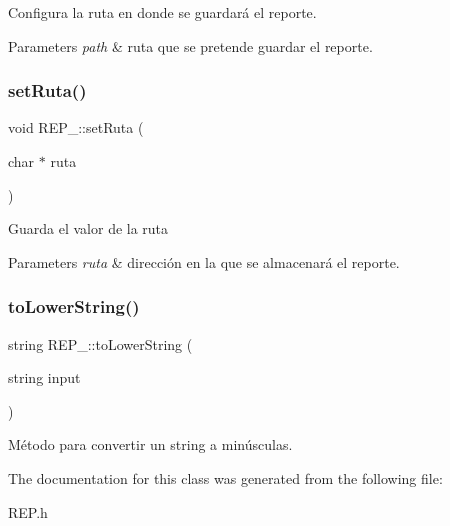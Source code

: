 Configura la ruta en donde se guardará el reporte. 
\begin{DoxyParams}{Parameters}
{\em path} & ruta que se pretende guardar el reporte. \\
\hline
\end{DoxyParams}
\mbox{\label{classREP___a6e13e906980b5ee0d3eb87021f3b73b9}} 
\subsubsection{\texorpdfstring{set\+Ruta()}{setRuta()}}
{\footnotesize\ttfamily void R\+E\+P\+\_\+\+::set\+Ruta (\begin{DoxyParamCaption}\item[{char $\ast$}]{ruta }\end{DoxyParamCaption})\hspace{0.3cm}{\ttfamily [inline]}}

Guarda el valor de la ruta 
\begin{DoxyParams}{Parameters}
{\em ruta} & dirección en la que se almacenará el reporte. \\
\hline
\end{DoxyParams}
\mbox{\label{classREP___ae1d0fa6e478eac36a3246d73e574b9f2}} 
\subsubsection{\texorpdfstring{to\+Lower\+String()}{toLowerString()}}
{\footnotesize\ttfamily string R\+E\+P\+\_\+\+::to\+Lower\+String (\begin{DoxyParamCaption}\item[{string}]{input }\end{DoxyParamCaption})}

Método para convertir un string a minúsculas. 

The documentation for this class was generated from the following file\+:\begin{DoxyCompactItemize}
\item 
R\+E\+P.\+h\end{DoxyCompactItemize}
